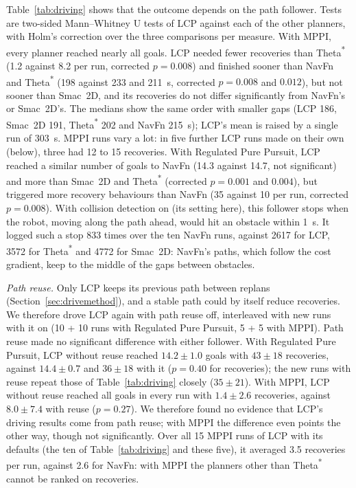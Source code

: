 \documentclass[conference]{IEEEtran}
\newcommand{\lcp}{LCP}
\begin{document}
Table~\ref{tab:driving} shows that the outcome depends on the path follower.
Tests are two-sided Mann--Whitney U tests of \lcp{} against each of the other planners,
with Holm's correction over the three comparisons per measure. With MPPI, every
planner reached nearly all goals. \lcp{} needed fewer recoveries than
Theta\textsuperscript{*} (1.2 against 8.2 per run, corrected $p = 0.008$) and
finished sooner than NavFn and Theta\textsuperscript{*} (198 against 233 and
\SI{211}{s}, corrected $p = 0.008$ and $0.012$), but not sooner than Smac~2D, and
its recoveries do not differ significantly from NavFn's or Smac~2D's. The medians
show the same order with smaller gaps (\lcp{} 186, Smac~2D 191,
Theta\textsuperscript{*} 202 and NavFn \SI{215}{s}); \lcp{}'s mean is raised by a
single run of \SI{303}{s}. MPPI runs vary a lot: in five further
\lcp{} runs made on their own (below), three had 12 to 15 recoveries. With
Regulated Pure Pursuit, \lcp{} reached a similar
number of goals to NavFn (14.3 against 14.7, not significant) and more than
Smac~2D and Theta\textsuperscript{*} (corrected $p = 0.001$ and $0.004$), but
triggered more recovery behaviours than NavFn (35 against 10 per run, corrected
$p = 0.008$). With collision detection on (its setting here), this follower stops when the
robot, moving along the path ahead, would hit an obstacle within \SI{1}{s}. It
logged such a stop 833 times over the ten NavFn runs, against \num{2617} for
\lcp{}, \num{3572} for Theta\textsuperscript{*} and \num{4772} for Smac~2D:
NavFn's paths, which follow the cost gradient, keep to the middle of the gaps
between obstacles.

\emph{Path reuse.} Only \lcp{} keeps its previous path between replans
(Section~\ref{sec:drivemethod}), and a stable path could by itself reduce recoveries.
We therefore drove \lcp{} again with path reuse off, interleaved with new runs
with it on (10 + 10 runs with Regulated Pure Pursuit, 5 + 5 with MPPI). Path
reuse made no significant difference with either follower. With Regulated Pure
Pursuit, \lcp{} without reuse reached $14.2 \pm 1.0$ goals with $43 \pm 18$
recoveries, against $14.4 \pm 0.7$ and $36 \pm 18$ with it ($p = 0.40$ for
recoveries); the new runs with reuse repeat those of Table~\ref{tab:driving}
closely ($35 \pm 21$). With MPPI, \lcp{} without reuse reached all goals in every
run with $1.4 \pm 2.6$ recoveries, against $8.0 \pm 7.4$ with reuse ($p = 0.27$).
We therefore found no evidence that \lcp{}'s driving results come from path
reuse; with MPPI the difference even points the other way, though not
significantly. Over all 15 MPPI
runs of \lcp{} with its defaults (the ten of Table~\ref{tab:driving} and these
five), it averaged 3.5 recoveries per run, against 2.6 for NavFn: with MPPI the
planners other than Theta\textsuperscript{*} cannot be ranked on recoveries.
\end{document}
